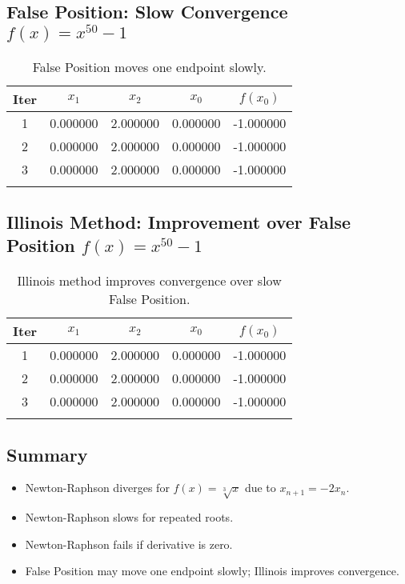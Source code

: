 \documentclass[12pt,a4paper]{article}
\begin{document}
\subsection*{False Position: Slow Convergence $f(x) = x^{50}-1$}

\begin{longtable}{|c|c|c|c|c|}
\hline
Iter & $x_1$ & $x_2$ & $x_0$ & $f(x_0)$ \\ \hline
1 & 0.000000 & 2.000000 & 0.000000 & -1.000000 \\
2 & 0.000000 & 2.000000 & 0.000000 & -1.000000 \\
3 & 0.000000 & 2.000000 & 0.000000 & -1.000000 \\
\hline
\caption{False Position moves one endpoint slowly.}
\label{tab:falseposition-slow}
\end{longtable}

\subsection*{Illinois Method: Improvement over False Position $f(x) = x^{50}-1$}

\begin{longtable}{|c|c|c|c|c|}
\hline
Iter & $x_1$ & $x_2$ & $x_0$ & $f(x_0)$ \\ \hline
1 & 0.000000 & 2.000000 & 0.000000 & -1.000000 \\
2 & 0.000000 & 2.000000 & 0.000000 & -1.000000 \\
3 & 0.000000 & 2.000000 & 0.000000 & -1.000000 \\
\hline
\caption{Illinois method improves convergence over slow False Position.}
\label{tab:illinois-improve}
\end{longtable}

\subsection*{Summary}

\begin{itemize}
    \item Newton-Raphson diverges for $f(x)=\sqrt[3]{x}$ due to $x_{n+1}=-2x_n$.
    \item Newton-Raphson slows for repeated roots.
    \item Newton-Raphson fails if derivative is zero.
    \item False Position may move one endpoint slowly; Illinois improves convergence.
\end{itemize}
\end{document}
